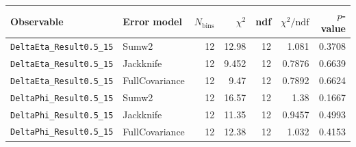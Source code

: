 \begin{tabular}{|l|l|r|r|r|r|r|}
\hline
Observable & Error model & $N_{\mathrm{bins}}$ & $\chi^2$ & ndf & $\chi^2/\mathrm{ndf}$ & $p$-value \\
\hline
\texttt{DeltaEta\_Result0.5\_15} & Sumw2 & 12 & 12.98 & 12 & 1.081 & 0.3708 \\
\texttt{DeltaEta\_Result0.5\_15} & Jackknife & 12 & 9.452 & 12 & 0.7876 & 0.6639 \\
\texttt{DeltaEta\_Result0.5\_15} & FullCovariance & 12 & 9.47 & 12 & 0.7892 & 0.6624 \\
\texttt{DeltaPhi\_Result0.5\_15} & Sumw2 & 12 & 16.57 & 12 & 1.38 & 0.1667 \\
\texttt{DeltaPhi\_Result0.5\_15} & Jackknife & 12 & 11.35 & 12 & 0.9457 & 0.4993 \\
\texttt{DeltaPhi\_Result0.5\_15} & FullCovariance & 12 & 12.38 & 12 & 1.032 & 0.4153 \\
\hline
\end{tabular}
